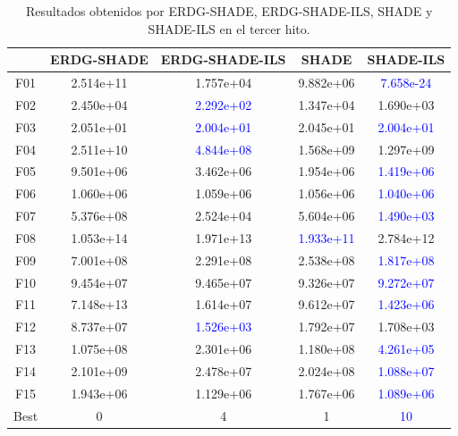 \begin{table}[h]
\centering
\begin{tabular}{ccccc}
\toprule
{} &  \textbf{ERDG-SHADE} & \textbf{ERDG-SHADE-ILS} & \textbf{SHADE} & \textbf{SHADE-ILS} \\
\midrule
F01  &  2.514e+11 &    1.757e+04 &  9.882e+06 &  \textcolor{blue}{7.658e-24} \\
F02  &  2.450e+04 &    \textcolor{blue}{2.292e+02} &  1.347e+04 &  1.690e+03 \\
F03  &  2.051e+01 &    \textcolor{blue}{2.004e+01} &  2.045e+01 &  \textcolor{blue}{2.004e+01} \\
F04  &  2.511e+10 &    \textcolor{blue}{4.844e+08} &  1.568e+09 &  1.297e+09 \\
F05  &  9.501e+06 &    3.462e+06 &  1.954e+06 &  \textcolor{blue}{1.419e+06} \\
F06  &  1.060e+06 &    1.059e+06 &  1.056e+06 &  \textcolor{blue}{1.040e+06} \\
F07  &  5.376e+08 &    2.524e+04 &  5.604e+06 &  \textcolor{blue}{1.490e+03} \\
F08  &  1.053e+14 &    1.971e+13 &  \textcolor{blue}{1.933e+11} &  2.784e+12 \\
F09  &  7.001e+08 &    2.291e+08 &  2.538e+08 &  \textcolor{blue}{1.817e+08} \\
F10  &  9.454e+07 &    9.465e+07 &  9.326e+07 &  \textcolor{blue}{9.272e+07} \\
F11  &  7.148e+13 &    1.614e+07 &  9.612e+07 &  \textcolor{blue}{1.423e+06} \\
F12  &  8.737e+07 &    \textcolor{blue}{1.526e+03} &  1.792e+07 &  1.708e+03 \\
F13  &  1.075e+08 &    2.301e+06 &  1.180e+08 &  \textcolor{blue}{4.261e+05} \\
F14  &  2.101e+09 &    2.478e+07 &  2.024e+08 &  \textcolor{blue}{1.088e+07} \\
F15  &  1.943e+06 &    1.129e+06 &  1.767e+06 &  \textcolor{blue}{1.089e+06} \\
Best &          0 &            4 &          1 &         \textcolor{blue}{10} \\
\bottomrule
\end{tabular}
\caption{Resultados obtenidos por ERDG-SHADE, ERDG-SHADE-ILS, SHADE y SHADE-ILS en el tercer hito.}
\label{tab:resultados_erdg_shade_3}
\end{table}


